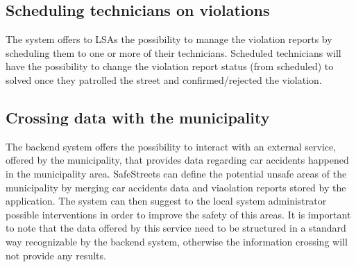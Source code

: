 \subsection{Scheduling technicians on violations}
The system offers to LSAs the possibility to manage the violation reports by scheduling them to one or more of their technicians.
Scheduled technicians will have the possibility to change the violation report status (from scheduled) to solved once they patrolled the street and confirmed/rejected the violation.

\subsection{Crossing data with the municipality}
The backend system offers the possibility to interact with an external service, offered by the municipality, that provides data regarding car accidents happened in the municipality area. SafeStreets can define the potential unsafe areas of the municipality by merging car accidents data and viaolation reports stored by the application. The system can then suggest to the local system administrator possible interventions in order to improve the safety of this areas. It is important to note that the data offered by this service need to be structured in a standard way recognizable by the backend system, otherwise the information crossing will not provide any results.
